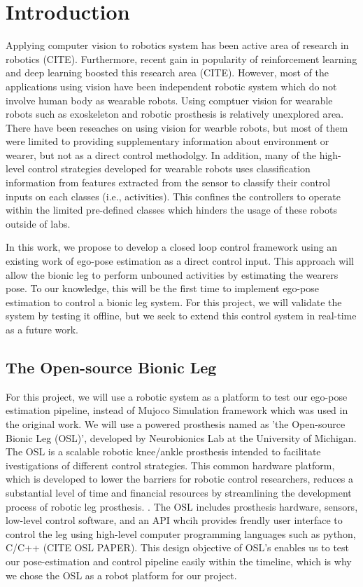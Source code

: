 \documentclass[10pt,twocolumn,letterpaper]{article}
\begin{document}
\section{Introduction}
Applying computer vision to robotics system has been active area of research in robotics (CITE). Furthermore, recent gain in popularity of reinforcement learning and deep learning boosted this research area (CITE). However, most of the applications using vision have been independent robotic system which do not involve human body as wearable robots. Using comptuer vision for wearable robots such as exoskeleton and robotic prosthesis is relatively unexplored area. There have been reseaches on using vision for wearble robots, but most of them were limited to providing supplementary information about environment or wearer, but not as a direct control methodolgy. In addition, many of the high-level control strategies developed for wearable robots uses classification information from features extracted from the sensor to classify their control inputs on each classes (i.e., activities). This confines the controllers to operate within the limited pre-defined classes which hinders the usage of these robots outside of labs.

In this work, we propose to develop a closed loop control framework using an existing work of ego-pose estimation as a direct control input. This approach will allow the bionic leg to perform unbouned activities by estimating the wearers pose. To our knowledge, this will be the first time to implement ego-pose estimation to control a bionic leg system. For this project, we will validate the system by testing it offline, but we seek to extend this control system in real-time as a future work.

\subsection{The Open-source Bionic Leg}
For this project, we will use a robotic system as a platform to test our ego-pose estimation pipeline, instead of Mujoco Simulation framework which was used in the original work. We will use a powered prosthesis named as 'the Open-source Bionic Leg (OSL)', developed by Neurobionics Lab at the University of Michigan. The OSL is a scalable robotic knee/ankle prosthesis intended to facilitate ivestigations of different control strategies. This common hardware platform, which is developed to lower the barriers for robotic control researchers, reduces a substantial level of time and financial resources by streamlining the development process of robotic leg prosthesis. . The OSL includes prosthesis hardware, sensors, low-level control software, and an API whcih provides frendly user interface to control the leg using high-level computer programming languages such as python, C/C++ (CITE OSL PAPER). This design objective of OSL's enables us to test our pose-estimation and control pipeline easily within the timeline, which is why we chose the OSL as a robot platform for our project.
\end{document}

